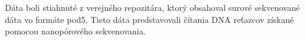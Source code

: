Dáta boli stiahnuté z verejného repozitára, ktorý obsahoval surové sekvenované dáta vo formáte pod5.
Tieto dáta predstavovali čítania DNA reťazcov získané pomocou nanopórového sekvenovania.
